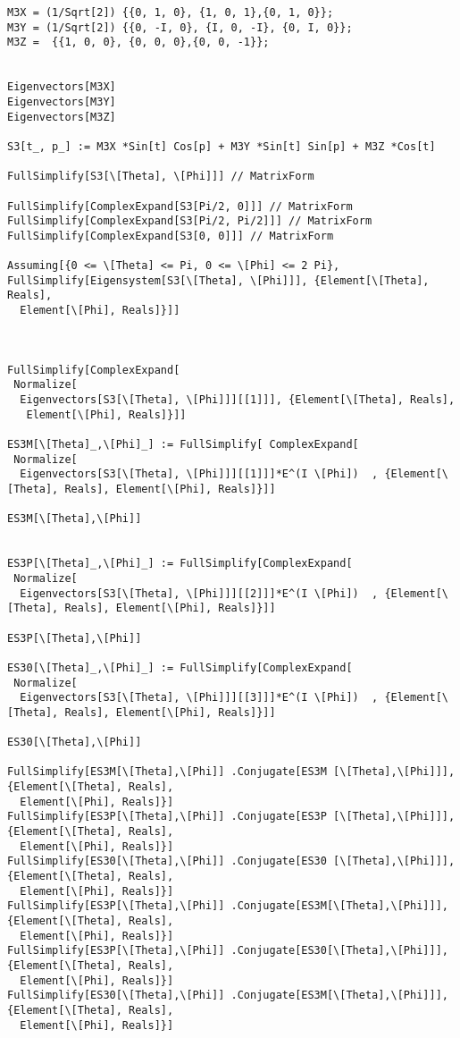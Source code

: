 \documentclass[%
  twocolumn,
 showpacs,
 showkeys,
 preprintnumbers,
 amsmath,amssymb,
 aps,
  pra,
  longbibliography,
 floatfix,
 ]{revtex4-1}
\begin{document}
{\begin{lstlisting}[backgroundcolor=\color{yellow!10},framerule=0pt,breaklines=true, frame=tb]
M3X = (1/Sqrt[2]) {{0, 1, 0}, {1, 0, 1},{0, 1, 0}};
M3Y = (1/Sqrt[2]) {{0, -I, 0}, {I, 0, -I}, {0, I, 0}};
M3Z =  {{1, 0, 0}, {0, 0, 0},{0, 0, -1}};


Eigenvectors[M3X]
Eigenvectors[M3Y]
Eigenvectors[M3Z]

S3[t_, p_] := M3X *Sin[t] Cos[p] + M3Y *Sin[t] Sin[p] + M3Z *Cos[t]

FullSimplify[S3[\[Theta], \[Phi]]] // MatrixForm

FullSimplify[ComplexExpand[S3[Pi/2, 0]]] // MatrixForm
FullSimplify[ComplexExpand[S3[Pi/2, Pi/2]]] // MatrixForm
FullSimplify[ComplexExpand[S3[0, 0]]] // MatrixForm

Assuming[{0 <= \[Theta] <= Pi, 0 <= \[Phi] <= 2 Pi}, FullSimplify[Eigensystem[S3[\[Theta], \[Phi]]], {Element[\[Theta], Reals],
  Element[\[Phi], Reals]}]]



FullSimplify[ComplexExpand[
 Normalize[
  Eigenvectors[S3[\[Theta], \[Phi]]][[1]]], {Element[\[Theta], Reals],
   Element[\[Phi], Reals]}]]

ES3M[\[Theta]_,\[Phi]_] := FullSimplify[ ComplexExpand[
 Normalize[
  Eigenvectors[S3[\[Theta], \[Phi]]][[1]]]*E^(I \[Phi])  , {Element[\[Theta], Reals], Element[\[Phi], Reals]}]]

ES3M[\[Theta],\[Phi]]


ES3P[\[Theta]_,\[Phi]_] := FullSimplify[ComplexExpand[
 Normalize[
  Eigenvectors[S3[\[Theta], \[Phi]]][[2]]]*E^(I \[Phi])  , {Element[\[Theta], Reals], Element[\[Phi], Reals]}]]

ES3P[\[Theta],\[Phi]]

ES30[\[Theta]_,\[Phi]_] := FullSimplify[ComplexExpand[
 Normalize[
  Eigenvectors[S3[\[Theta], \[Phi]]][[3]]]*E^(I \[Phi])  , {Element[\[Theta], Reals], Element[\[Phi], Reals]}]]

ES30[\[Theta],\[Phi]]

FullSimplify[ES3M[\[Theta],\[Phi]] .Conjugate[ES3M [\[Theta],\[Phi]]], {Element[\[Theta], Reals],
  Element[\[Phi], Reals]}]
FullSimplify[ES3P[\[Theta],\[Phi]] .Conjugate[ES3P [\[Theta],\[Phi]]], {Element[\[Theta], Reals],
  Element[\[Phi], Reals]}]
FullSimplify[ES30[\[Theta],\[Phi]] .Conjugate[ES30 [\[Theta],\[Phi]]], {Element[\[Theta], Reals],
  Element[\[Phi], Reals]}]
FullSimplify[ES3P[\[Theta],\[Phi]] .Conjugate[ES3M[\[Theta],\[Phi]]], {Element[\[Theta], Reals],
  Element[\[Phi], Reals]}]
FullSimplify[ES3P[\[Theta],\[Phi]] .Conjugate[ES30[\[Theta],\[Phi]]], {Element[\[Theta], Reals],
  Element[\[Phi], Reals]}]
FullSimplify[ES30[\[Theta],\[Phi]] .Conjugate[ES3M[\[Theta],\[Phi]]], {Element[\[Theta], Reals],
  Element[\[Phi], Reals]}]



\end{lstlisting}}
\end{document}
